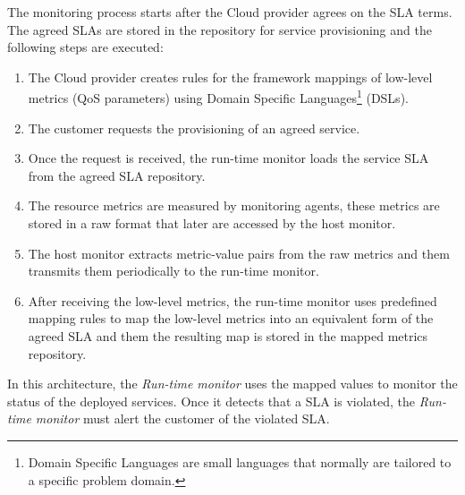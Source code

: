 The monitoring process starts after the Cloud provider agrees on the SLA terms.
The agreed SLAs are stored in the repository for service provisioning and the following
steps are executed:
\begin{enumerate}
  \item The Cloud provider creates rules for the framework mappings of low-level metrics (QoS parameters) using Domain Specific
  Languages\footnote{Domain Specific Languages are small languages that normally are tailored to a specific
  problem domain.} (DSLs).
  \item The customer requests the provisioning of an agreed service.
  \item Once the request is received, the run-time monitor loads the service SLA from the agreed SLA repository.
  \item The resource metrics are measured by monitoring agents, these metrics are stored in a raw format that
  later are accessed by the host monitor.
  \item The host monitor extracts metric-value pairs from the raw metrics and them transmits them periodically to
  the run-time monitor.
  \item After receiving the low-level metrics, the run-time monitor uses predefined mapping rules to map the
  low-level metrics into an equivalent form of the agreed SLA and them the resulting map is stored in the
  mapped metrics repository.
\end{enumerate}

In this architecture, the \textit{Run-time monitor} uses the mapped values to monitor the status of the deployed services.
Once it detects that a SLA is violated, the \textit{Run-time monitor} must alert the customer of the violated SLA.
